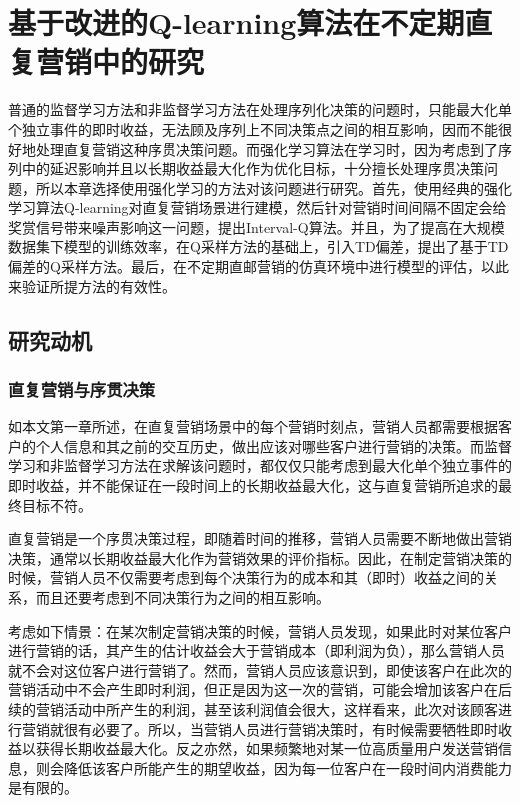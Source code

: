 
\chapter{基于改进的Q-learning算法在不定期直复营销中的研究}

普通的监督学习方法和非监督学习方法在处理序列化决策的问题时，只能最大化单个独立事件的即时收益，无法顾及序列上不同决策点之间的相互影响，因而不能很好地处理直复营销这种序贯决策问题。而强化学习算法在学习时，因为考虑到了序列中的延迟影响并且以长期收益最大化作为优化目标，十分擅长处理序贯决策问题，所以本章选择使用强化学习的方法对该问题进行研究。首先，使用经典的强化学习算法Q-learning对直复营销场景进行建模，然后针对营销时间间隔不固定会给奖赏信号带来噪声影响这一问题，提出Interval-Q算法。并且，为了提高在大规模数据集下模型的训练效率，在Q采样方法的基础上，引入TD偏差，提出了基于TD偏差的Q采样方法。最后，在不定期直邮营销的仿真环境中进行模型的评估，以此来验证所提方法的有效性。

\section{研究动机}
\subsection{直复营销与序贯决策}
如本文第一章所述，在直复营销场景中的每个营销时刻点，营销人员都需要根据客户的个人信息和其之前的交互历史，做出应该对哪些客户进行营销的决策。而监督学习和非监督学习方法在求解该问题时，都仅仅只能考虑到最大化单个独立事件的即时收益，并不能保证在一段时间上的长期收益最大化，这与直复营销所追求的最终目标不符。

直复营销是一个序贯决策过程，即随着时间的推移，营销人员需要不断地做出营销决策，通常以长期收益最大化作为营销效果的评价指标。因此，在制定营销决策的时候，营销人员不仅需要考虑到每个决策行为的成本和其（即时）收益之间的关系，而且还要考虑到不同决策行为之间的相互影响。

考虑如下情景：在某次制定营销决策的时候，营销人员发现，如果此时对某位客户进行营销的话，其产生的估计收益会大于营销成本（即利润为负），那么营销人员就不会对这位客户进行营销了。然而，营销人员应该意识到，即使该客户在此次的营销活动中不会产生即时利润，但正是因为这一次的营销，可能会增加该客户在后续的营销活动中所产生的利润，甚至该利润值会很大，这样看来，此次对该顾客进行营销就很有必要了。所以，当营销人员进行营销决策时，有时候需要牺牲即时收益以获得长期收益最大化。反之亦然，如果频繁地对某一位高质量用户发送营销信息，则会降低该客户所能产生的期望收益，因为每一位客户在一段时间内消费能力是有限的。

